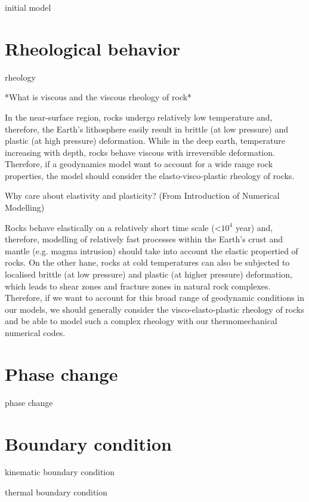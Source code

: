 initial model

\section{Rheological behavior}

rheology

*What is viscous and the viscous rheology of rock*

In the near-surface region, rocks undergo relatively low temperature and, therefore, the Earth's lithosphere easily result in brittle (at low pressure) and plastic (at high pressure) deformation. While in the deep earth, temperature increasing with depth, rocks behave viscous with irreversible deformation. Therefore, if a geodynamics model want to account for a wide range rock properties, the model should consider the elasto-visco-plastic rheology of rocks.





Why care about elastivity and plasticity? (From Introduction of Numerical Modelling)

Rocks behave elastically on a relatively short time scale (<$10^4$ year) and, therefore, modelling of relatively fast processes within the Earth's crust and mantle (e.g. magma intrusion) should take into account the elastic propertied of rocks. 
On the other hane, rocks at cold temperatures can also be subjected to localised brittle (at low pressure) and plastic (at higher pressure) deformation, which leads to shear zones and fracture zones in natural rock complexes.
Therefore, if we want to account for this broad range of geodynamic conditions in our models, we should generally consider the visco-elasto-plastic rheology of rocks and be able to model such a complex rheology with our thermomechanical numerical codes.

\section{Phase change}

phase change

\section{Boundary condition}

kinematic boundary condition

thermal boundary condition
